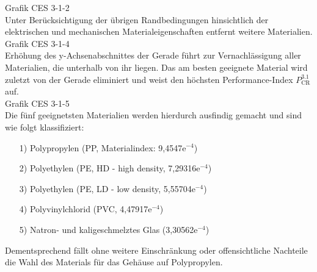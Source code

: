 Grafik CES 3-1-2\\
Unter Berücksichtigung der übrigen Randbedingungen hinsichtlich der elektrischen und mechanischen Materialeigenschaften entfernt weitere Materialien.\\
Grafik CES 3-1-4\\
Erhöhung des y-Achsenabschnittes der Gerade führt zur Vernachlässigung aller Materialien, die unterhalb von ihr liegen. Das am besten geeignete Material wird zuletzt von der Gerade eliminiert und weist den höchsten Performance-Index $P_{\text{CR}}^{3.1}$ auf.\\
Grafik CES 3-1-5\\
Die fünf geeignetsten Materialien werden hierdurch ausfindig gemacht und sind wie folgt klassifiziert:
\begin{itemize}
\item[1)] Polypropylen (PP, Materialindex: 9,4547e$^{-4}$)
\item[2)] Polyethylen (PE, HD - high density, 7,29316e$^{-4}$)
\item[3)] Polyethylen (PE, LD - low density, 5,55704e$^{-4}$)
\item[4)] Polyvinylchlorid (PVC, 4,47917e$^{-4}$)
\item[5)] Natron- und kaligeschmelztes Glas (3,30562e$^{-4}$)
\end{itemize}
Dementsprechend fällt ohne weitere Einschränkung oder offensichtliche Nachteile die Wahl des Materials für das Gehäuse auf Polypropylen.

